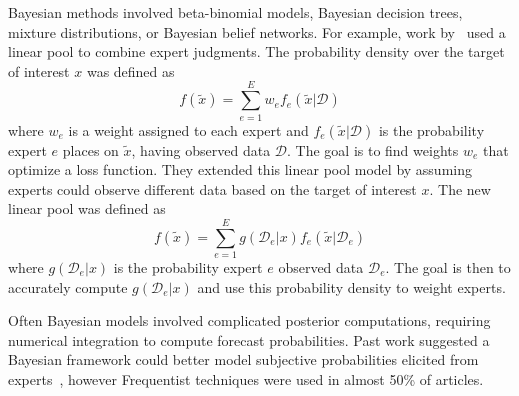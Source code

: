 \documentclass[preprint,authoryear,nonatbib]{elsarticle}
\def\l{\left}
\def\r{\right}
\begin{document}
Bayesian methods involved beta-binomial models, Bayesian decision trees, mixture distributions, or Bayesian belief networks.
For example, work by~\parencite{zio1997accounting} used a linear pool to combine expert judgments.
The probability density over the target of interest $x$ was defined as
\begin{equation*}
  f(\tilde{x}) = \sum_{e=1}^{E} w_{e} f_{e}\l( \tilde{x} | \mathcal{D} \r)
\end{equation*}
where $w_{e}$ is a weight assigned to each expert and $f_{e}\l( \tilde{x} | \mathcal{D} \r)$ is the probability expert $e$ places on $\tilde{x}$, having observed data $\mathcal{D}$.
The goal is to find weights $w_{e}$ that optimize a loss function.
They extended this linear pool model by assuming experts could observe different data based on the target of interest $x$.
The new linear pool was defined as
\begin{equation*}
  f(\tilde{x}) = \sum_{e=1}^{E} g( \mathcal{D}_{e} | x ) f_{e}\l( \tilde{x} | \mathcal{D}_{e} \r)
\end{equation*}
where $g(\mathcal{D}_{e}|x)$ is the probability expert $e$ observed data $\mathcal{D}_{e}$.
The goal is then to accurately compute $g( \mathcal{D}_{e} | x ) $ and use this probability density to weight experts.

Often Bayesian models involved complicated posterior computations, requiring numerical integration to compute forecast probabilities.
Past work suggested a Bayesian framework could better model subjective probabilities elicited from experts~\parencite{clemen2007advances}, however Frequentist techniques were used in almost 50\% of articles. 
\end{document}
